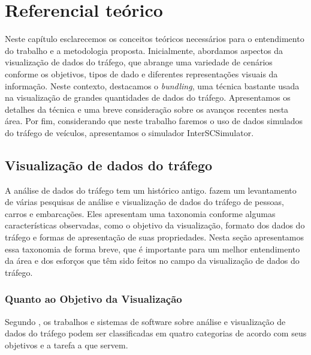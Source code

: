 \chapter{Referencial teórico}
\label{cap:referencial-teorico}

  Neste capítulo esclarecemos os conceitos teóricos necessários para o
entendimento do trabalho e a metodologia proposta. Inicialmente, abordamos
aspectos da visualização de dados do tráfego, que abrange uma variedade de
cenários conforme os objetivos, tipos de dado e diferentes representações
visuais da informação. Neste contexto, destacamos o \emph{bundling}, uma
técnica bastante usada na visualização de grandes quantidades de dados do
tráfego. Apresentamos os detalhes da técnica e uma breve consideração sobre os
avanços recentes nesta área. Por fim, considerando que neste trabalho faremos o
uso de dados simulados do tráfego de veículos, apresentamos o simulador
InterSCSimulator.

\section{Visualização de dados do tráfego}

  A análise de dados do tráfego tem um histórico antigo. \citet{Chen2015} fazem
um levantamento de várias pesquisas de análise e visualização de dados do
tráfego de pessoas, carros e embarcações. Eles apresentam uma taxonomia
conforme algumas características observadas, como o objetivo da visualização,
formato dos dados do tráfego e formas de apresentação de suas propriedades.
Nesta seção apresentamos essa taxonomia de forma breve, que é importante para
um melhor entendimento da área e dos esforços que têm sido feitos no campo da
visualização de dados do tráfego.

\subsection{Quanto ao Objetivo da Visualização}

  Segundo \citet{Chen2015}, os trabalhos e sistemas de software sobre análise e
visualização de dados do tráfego podem ser classificadas em quatro categorias
de acordo com seus objetivos e a tarefa a que servem.

